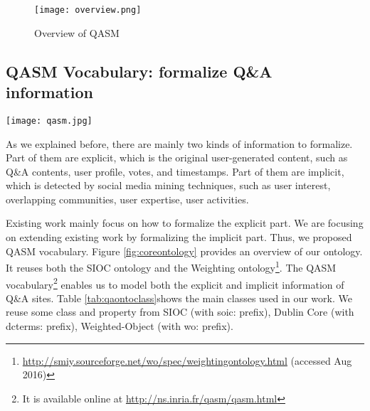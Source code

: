 \begin{figure}%
\centering
\texttt{[image: overview.png]}  
\caption{Overview of QASM}
\label{fig:overview} 
\end{figure}

\subsection{QASM Vocabulary: formalize Q\&A information}
\begin{sidewaysfigure}
\centering
\texttt{[image: qasm.jpg]}
\caption{Overview of the QASM vocabulary}
\label{fig:coreontology} 
\end{sidewaysfigure}

As we explained before, there are mainly two kinds of information to formalize. Part of them are explicit, which is the original user-generated content, such as Q\&A contents, user profile, votes, and timestamps. Part of them are implicit, which is detected by social media mining techniques, such as user interest, overlapping communities, user expertise, user activities. 

Existing work mainly focus on how to formalize the explicit part. We are focusing on extending existing work by formalizing the implicit part. Thus, we proposed QASM vocabulary. Figure \ref{fig:coreontology} provides an overview of our ontology. It reuses both the SIOC ontology and the Weighting ontology\footnote{\url{http://smiy.sourceforge.net/wo/spec/weightingontology.html} (accessed Aug 2016)}.
The QASM vocabulary\footnote{It is available online at \url{http://ns.inria.fr/qasm/qasm.html}} enables us to model both the explicit and implicit information of Q\&A sites. Table \ref{tab:qaontoclass}shows the main classes used in our work.
%
We reuse some class and property from SIOC (with soic: prefix), Dublin Core (with dcterms: prefix), Weighted-Object (with wo: prefix). 


